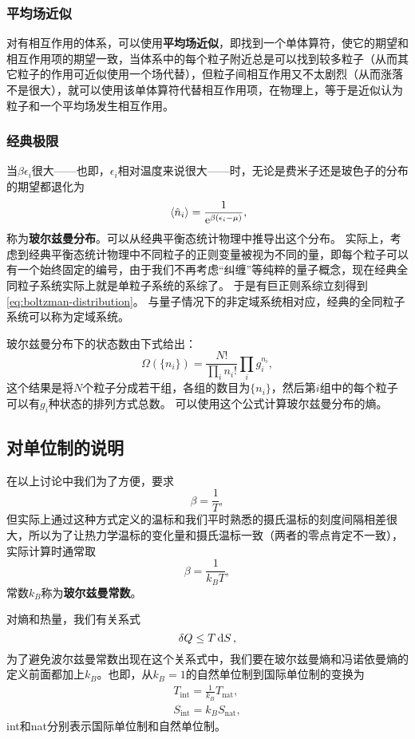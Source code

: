 \documentclass[hyperref, UTF8, a4paper]{ctexart}
\newcommand*{\ee}{\mathrm{e}}
\begin{document}
\subsubsection{平均场近似}

对有相互作用的体系，可以使用\textbf{平均场近似}，即找到一个单体算符，使它的期望和相互作用项的期望一致，当体系中的每个粒子附近总是可以找到较多粒子（从而其它粒子的作用可近似使用一个场代替），但粒子间相互作用又不太剧烈（从而涨落不是很大），就可以使用该单体算符代替相互作用项，在物理上，等于是近似认为粒子和一个平均场发生相互作用。

\subsubsection{经典极限}

当$\beta \epsilon_i$很大——也即，$\epsilon_i$相对温度来说很大——时，无论是费米子还是玻色子的分布的期望都退化为
\begin{equation}
    \expval*{\hat{n}_i} = \frac{1}{\ee^{\beta (\epsilon_i - \mu)}},
    \label{eq:boltzman-distribution}
\end{equation}
称为\textbf{玻尔兹曼分布}。可以从经典平衡态统计物理中推导出这个分布。
实际上，考虑到经典平衡态统计物理中不同粒子的正则变量被视为不同的量，即每个粒子可以有一个始终固定的编号，由于我们不再考虑“纠缠”等纯粹的量子概念，现在经典全同粒子系统实际上就是单粒子系统的系综了。
于是有巨正则系综立刻得到\eqref{eq:boltzman-distribution}。
与量子情况下的非定域系统相对应，经典的全同粒子系统可以称为定域系统。

玻尔兹曼分布下的状态数由下式给出：
\[
    \Omega(\{n_i\}) = \frac{N!}{\prod_i n_i!} \prod_i g_i^{n_i},
\]
这个结果是将$N$个粒子分成若干组，各组的数目为$\{n_i\}$，然后第$i$组中的每个粒子可以有$g_i$种状态的排列方式总数。
可以使用这个公式计算玻尔兹曼分布的熵。

\subsection{对单位制的说明}

在以上讨论中我们为了方便，要求
\[
    \beta = \frac{1}{T},
\]
但实际上通过这种方式定义的温标和我们平时熟悉的摄氏温标的刻度间隔相差很大，所以为了让热力学温标的变化量和摄氏温标一致（两者的零点肯定不一致），实际计算时通常取
\begin{equation}
    \beta = \frac{1}{k_B T},
\end{equation}
常数$k_B$称为\textbf{玻尔兹曼常数}。

对熵和热量，我们有关系式
\[
    \var{Q} \leq T \dd{S},
\]
为了避免波尔兹曼常数出现在这个关系式中，我们要在玻尔兹曼熵和冯诺依曼熵的定义前面都加上$k_B$。也即，从$k_B=1$的自然单位制到国际单位制的变换为
\begin{equation}
    \begin{aligned}
        T_\text{int} = \frac{1}{k_B} T_\text{nat}, \\
        S_\text{int} = k_B S_\text{nat},
    \end{aligned}
\end{equation}
int和nat分别表示国际单位制和自然单位制。
\end{document}
